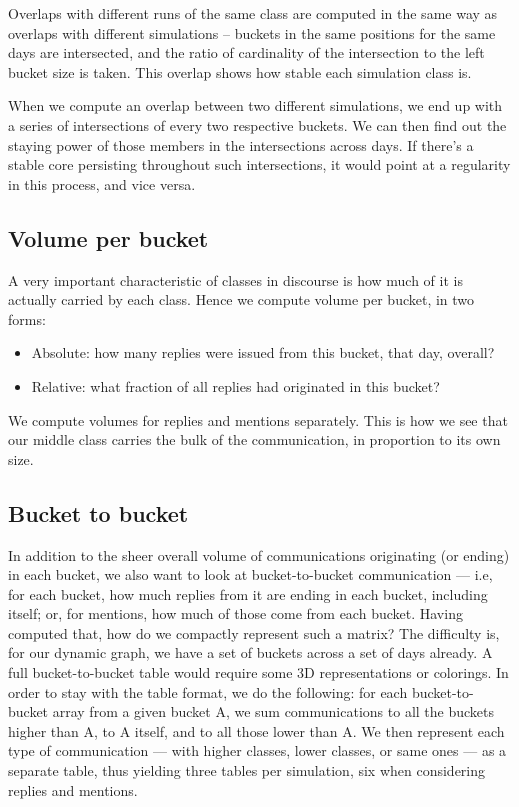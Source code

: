 \documentclass[10pt,oneside]{memoir}
\begin{document}
\label{sec:overx-xreps}
Overlaps with different runs of the same class are computed in the same way as overlaps with different simulations -- buckets in the same positions for the same days are intersected, and the ratio of cardinality of the intersection to the left bucket size is taken.  This overlap shows how stable each simulation class is.


When we compute an overlap between two different simulations, we end up with a series of intersections of every two respective buckets.  We can then find out the staying power of those members in the intersections across days.  If there's a stable core persisting throughout such intersections, it would point at a regularity in this process, and vice versa.


\pagebreak \subsection{Volume per bucket}
\label{volumeperbucket}

A very important characteristic of classes in discourse is how much of it is actually carried by each class.  Hence we compute volume per bucket, in two forms:


\begin{itemize}


\item Absolute: how many replies were issued from this bucket, that day, overall?

\item Relative: what fraction of all replies had originated in this bucket?
\end{itemize}

We compute volumes for replies and mentions separately.  This is how we see that our middle class carries the bulk of the communication, in proportion to its own size.  


\subsection{Bucket to bucket}
\label{buckettobucket}

In addition to the sheer overall volume of communications originating (or ending) in each bucket, we also want to look at bucket-to-bucket communication --- i.e, for each bucket, how much replies from it are ending in each bucket, including itself; or, for mentions, how much of those come from each bucket.
Having computed that, how do we compactly represent such a matrix?  The difficulty is, for our dynamic graph, we have a set of buckets across a set of days already.  A full bucket-to-bucket table would require some 3D representations or colorings.  In order to stay with the table format, we do the following: for each bucket-to-bucket array from a given bucket A, we sum communications to all the buckets higher than A, to A itself, and to all those lower than A.  We then represent each type of communication --- with higher classes, lower classes, or same ones --- as a separate table, thus yielding three tables per simulation, six when considering replies and mentions.
\end{document}
